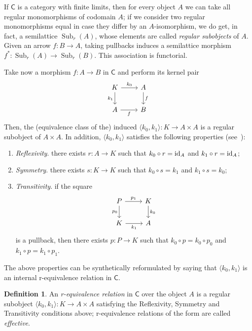 \documentclass{article}
\theoremstyle{definition}
\newtheorem{defn}{Definition}
\DeclareMathOperator{\Sub}{Sub}
\newcommand{\id}{\textup{id}}
\begin{document}
If $\mathsf{C}$ is a category with finite limits, then for every object $A$ we can take all regular monomorphisms of codomain $A$; if we consider two regular monomorphisms equal in case they differ by an $A$-isomorphism, we do get, in fact, a semilattice $\Sub_r(A)$, whose elements are called \emph{regular subobjects} of $A$. Given an arrow $f \colon B \longrightarrow A$, taking pullbacks induces a semilattice morphism $f^* \colon \Sub_r(A) \longrightarrow \Sub_r(B)$. This association is functorial. 

Take now a morphism $f \colon A \longrightarrow B$ in $\mathsf{C}$ and perform its kernel pair
\[\begin{tikzcd}[ampersand replacement=\&]
	K \& A \\
	A \& B
	\arrow["{k_0}", from=1-1, to=1-2]
	\arrow["{k_1}"', from=1-1, to=2-1]
	\arrow["f", from=1-2, to=2-2]
	\arrow["f"', from=2-1, to=2-2]
\end{tikzcd}\]
Then, the (equivalence class of the) induced $\langle k_0, k_1 \rangle \colon K \longrightarrow A \times A$ is a regular subobject of $A \times A$. In addition, $\langle k_0, k_1 \rangle$ satisfies the following properties (see~\cite[Definition 1.3.6]{elephant}):
\begin{enumerate}
    \item \emph{Reflexivity}. there exists $r \colon A \longrightarrow K$ such that $k_0 \circ r = \id_A$ and $k_1 \circ r = \id_A$;
    \item \emph{Symmetry}. there exists $s \colon K \longrightarrow K$ such that $k_0 \circ s = k_1$ and $k_1 \circ s = k_0$;
    \item \emph{Transitivity}. if the square
    \[\begin{tikzcd}[ampersand replacement=\&]
	P \& K \\
	K \& A
	\arrow["{p_1}", from=1-1, to=1-2]
	\arrow["{p_0}"', from=1-1, to=2-1]
	\arrow["{k_0}", from=1-2, to=2-2]
	\arrow["{k_1}"', from=2-1, to=2-2]
    \end{tikzcd}\]
    is a pullback, then there exists $p \colon P \longrightarrow K$ such that $k_0 \circ p = k_0 \circ p_0$ and $k_1 \circ p = k_1 \circ p_1$.
\end{enumerate}
The above properties can be synthetically reformulated by saying that $\langle k_0, k_1 \rangle$ is an internal r-equivalence relation in $\mathsf{C}$.

\begin{defn}
An \emph{r-equivalence relation} in $\mathsf{C}$ over the object $A$ is a regular subobject $\langle k_0, k_1 \rangle \colon K \longrightarrow A \times A$ satisfying the Reflexivity, Symmetry and Transitivity conditions above; r-equivalence relations of the form  are called \emph{effective}.
\end{defn}
\end{document}
